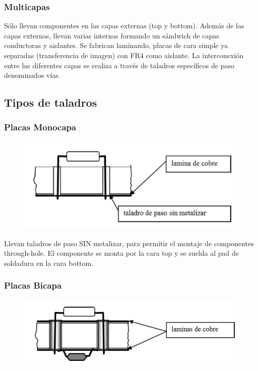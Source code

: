 \subsubsection{Multicapas}
Sólo llevan componentes en las capas externas (top y bottom). Además de las capas externas, llevan varias internas formando un sándwich de capas conductoras y aislantes. Se fabrican laminando, placas de cara simple ya separadas (transferencia de imagen) con FR4 como aislante. La interconexión entre las diferentes capas se realiza a través de taladros específicos de paso denominados vías.

\subsection{Tipos de taladros}

\subsubsection{Placas Monocapa}

\begin{figure}[H]
    \centering
    \includegraphics[width=0.5\linewidth]{Imagenes/PCI - Taladros Monocapa.png}
\end{figure}

Llevan taladros de paso SIN metalizar, para permitir el montaje de componentes through-hole. El componente se monta por la cara top y se suelda al pad de soldadura en la cara bottom.

\subsubsection{Placas Bicapa}

\begin{figure}[H]
    \centering
    \includegraphics[width=0.5\linewidth]{Imagenes/PCI - Taladros Bicapa.png}
\end{figure}

